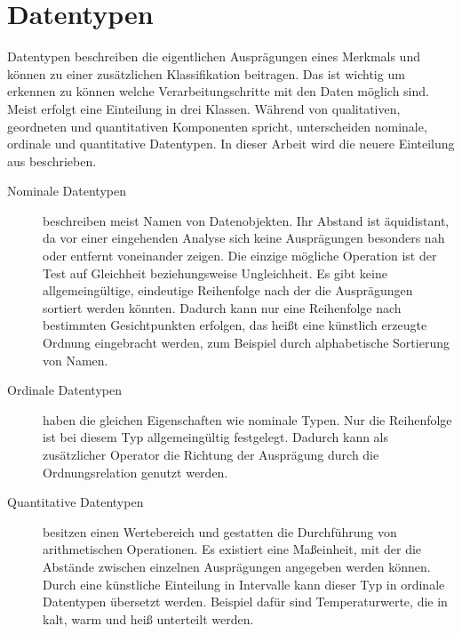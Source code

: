 \documentclass[a4paper, 12pt, DIVcalc, onepage, pdftex, headsepline, footsepline]{scrreprt}
\begin{document}
\section{Datentypen}
\label{sec:Datentypen}
Datentypen beschreiben die eigentlichen Ausprägungen eines Merkmals und können zu einer zusätzlichen
Klassifikation beitragen. Das ist wichtig um erkennen zu können welche Verarbeitungschritte mit den Daten
möglich sind. Meist erfolgt eine Einteilung in drei Klassen. Während \citep{Bertin} von qualitativen,
geordneten und quantitativen Komponenten spricht, unterscheiden \citep{Preim} nominale, ordinale und
quantitative Datentypen.
In dieser Arbeit wird die neuere Einteilung aus \citep{Preim} beschrieben.
\begin{description}
\item[Nominale Datentypen]
beschreiben meist Namen von Datenobjekten. Ihr Abstand ist äquidistant, da vor einer eingehenden Analyse sich
keine Ausprägungen besonders nah oder entfernt voneinander zeigen. Die einzige mögliche Operation ist der Test auf
Gleichheit beziehungsweise Ungleichheit. Es gibt keine allgemeingültige, eindeutige Reihenfolge
nach der die Ausprägungen sortiert werden könnten. Dadurch kann nur eine Reihenfolge nach bestimmten Gesichtpunkten erfolgen,
das heißt eine künstlich erzeugte Ordnung eingebracht werden, zum Beispiel durch alphabetische Sortierung von Namen.
\item[Ordinale Datentypen]
haben die gleichen Eigenschaften wie nominale Typen.
Nur die Reihenfolge ist bei diesem Typ allgemeingültig festgelegt. Dadurch kann als zusätzlicher Operator die Richtung der
Ausprägung durch die Ordnungsrelation genutzt werden.
\item[Quantitative Datentypen] besitzen einen Wertebereich und gestatten die Durchführung von arithmetischen Operationen. Es existiert eine
Maßeinheit, mit der die Abstände zwischen einzelnen Ausprägungen angegeben werden können. Durch eine 
künstliche Einteilung in Intervalle kann dieser Typ in ordinale Datentypen übersetzt werden. Beispiel
dafür sind Temperaturwerte, die in kalt, warm und heiß unterteilt werden.
\end{description}
\end{document}
